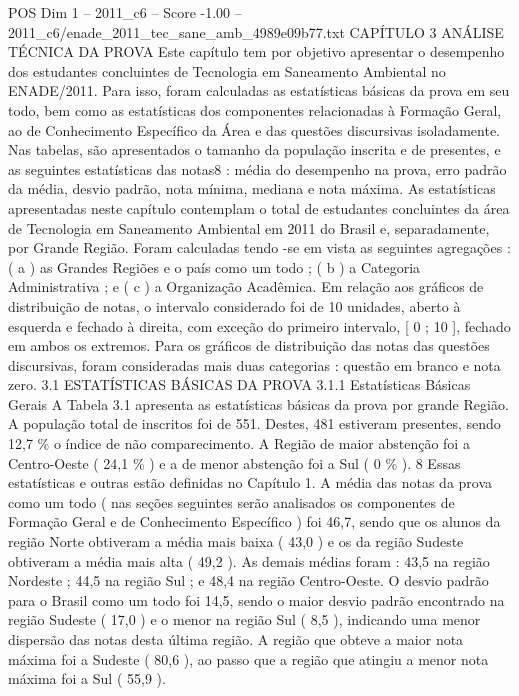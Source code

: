 \begin{textsample}{POS Dim 1 – 2011\_c6 – Score -1.00 – 2011\_c6/enade\_2011\_tec\_sane\_amb\_4989e09b77.txt}  \label{ex:f1_pos_213}
CAPÍTULO 3 ANÁLISE TÉCNICA DA PROVA Este capítulo tem por objetivo apresentar o desempenho dos estudantes concluintes de Tecnologia em Saneamento Ambiental no ENADE/2011.
Para isso, foram calculadas as estatísticas básicas da prova em seu todo, bem como as estatísticas dos componentes relacionadas à Formação Geral, ao de Conhecimento Específico da Área e das questões discursivas isoladamente.
Nas tabelas, são apresentados o tamanho da população inscrita e de presentes, e as seguintes estatísticas das notas8 : média do desempenho na prova, erro padrão da média, desvio padrão, nota mínima, mediana e nota máxima.
As estatísticas apresentadas neste capítulo contemplam o total de estudantes concluintes da área de Tecnologia em Saneamento Ambiental em 2011 do Brasil e, separadamente, por Grande Região.
Foram calculadas tendo -se em vista as seguintes agregações : ( a ) as Grandes Regiões e o país como um todo ; ( b ) a Categoria Administrativa ; e ( c ) a Organização Acadêmica.
Em relação aos gráficos de distribuição de notas, o intervalo considerado foi de 10 unidades, aberto à esquerda e fechado à direita, com exceção do primeiro intervalo, [ 0 ; 10 ], fechado em ambos os extremos.
Para os gráficos de distribuição das notas das questões discursivas, foram consideradas mais duas categorias : questão em branco e nota zero. 3.1 ESTATÍSTICAS BÁSICAS DA PROVA 3.1.1 Estatísticas Básicas Gerais A Tabela 3.1 apresenta as estatísticas básicas da prova por grande Região.
A população total de inscritos foi de 551.
Destes, 481 estiveram presentes, sendo 12,7 \% o índice de não comparecimento.
A Região de maior abstenção foi a Centro-Oeste ( 24,1 \% ) e a de menor abstenção foi a Sul ( 0 \% ). 8 Essas estatísticas e outras estão definidas no Capítulo 1.
A média das notas da prova como um todo ( nas seções seguintes serão analisados os componentes de Formação Geral e de Conhecimento Específico ) foi 46,7, sendo que os alunos da região Norte obtiveram a média mais baixa ( 43,0 ) e os da região Sudeste obtiveram a média mais alta ( 49,2 ).
As demais médias foram : 43,5 na região Nordeste ; 44,5 na região Sul ; e 48,4 na região Centro-Oeste.
O desvio padrão para o Brasil como um todo foi 14,5, sendo o maior desvio padrão encontrado na região Sudeste ( 17,0 ) e o menor na região Sul ( 8,5 ), indicando uma menor dispersão das notas desta última região.
A região que obteve a maior nota máxima foi a Sudeste ( 80,6 ), ao passo que a região que atingiu a menor nota máxima foi a Sul ( 55,9 ).

\end{textsample}
